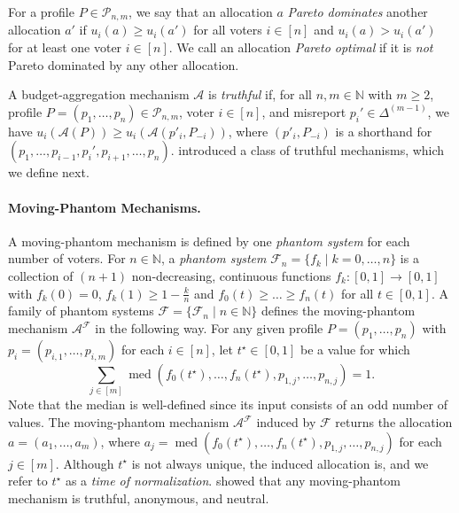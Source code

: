 \documentclass[11pt]{article}
\DeclareMathOperator*{\med}{med}
\newcommand{\F}{\mathcal{F}}
\newcommand{\A}{\mathcal{A}}
\newcommand{\N}{\mathbb{N}}
\newcommand{\p}{p}   %
\begin{document}
For a profile $P \in \mathcal{P}_{n,m}$, we say that an allocation $a$ \textit{Pareto dominates} another allocation $a'$ if $u_i(a) \ge u_i(a')$ for all voters $i \in [n]$ and $u_i(a) > u_i(a')$ for at least one voter $i \in [n]$. We call an allocation \textit{Pareto optimal} if it is \textit{not} Pareto dominated by any other allocation.   

A budget-aggregation mechanism $\A$ is \emph{truthful} if, for all $n, m \in \N$ with $m \ge 2$, profile $P = (\p_1, \dots, \p_n) \in \mathcal{P}_{n,m}$, voter $i \in [n]$, and misreport $\p_i' \in \Delta^{(m-1)}$, we have $u_i(\A(P)) \ge u_i(\A(p'_i,P_{-i}))$, where $(p'_i,P_{-i})$ is a shorthand for $(\p_1, \dots, \p_{i-1}, \p_i', \p_{i+1}, \dots, \p_n)$.
\citet{freeman2021truthful} introduced a class of truthful mechanisms, which we define next. 

\paragraph{Moving-Phantom Mechanisms.}
A moving-phantom mechanism is defined by one \textit{phantom system} for each number of voters. 
For $n \in \N$, a \textit{phantom system} $\F_n = \{f_k \mid k=0,\dots,n\}$ is a collection of $(n+1)$ non-decreasing, continuous functions $f_k\colon [0,1] \rightarrow [0,1]$ with $f_k(0) = 0$, $f_k(1) \ge 1- \frac{k}{n}$ and $f_0(t) \ge \dots \ge f_n(t)$ for all $t \in [0,1]$.
A family of phantom systems $\F = \{\F_n \mid n \in \N\}$ defines the moving-phantom mechanism $\A^\F$ in the following way. 
For any given profile $P = (\p_1, \dots, \p_n)$ with $p_i = (p_{i,1}, \dots, p_{i,m})$ for each $i \in [n]$, let $t^\star \in [0,1]$ be a value for which
$$
    \sum_{j \in [m]} \med(f_0(t^\star), \dots, f_n(t^\star), \p_{1,j}, \dots, \p_{n,j}) = 1. 
$$
Note that the median is well-defined since its input consists of an odd number of values. The moving-phantom mechanism $\A^\F$ induced by $\F$ returns the allocation $a=(a_1,\ldots,a_m)$, where $a_j = \med(f_0(t^\star), \dots, f_n(t^\star), \p_{1,j}, \dots, \p_{n,j})$ for each $j \in [m]$. Although $t^\star$ is not always unique, the induced allocation is, and we refer to $t^\star$ as a \emph{time of normalization}. \citet{freeman2021truthful} showed that any moving-phantom mechanism is truthful, anonymous, and neutral. 
\end{document}
